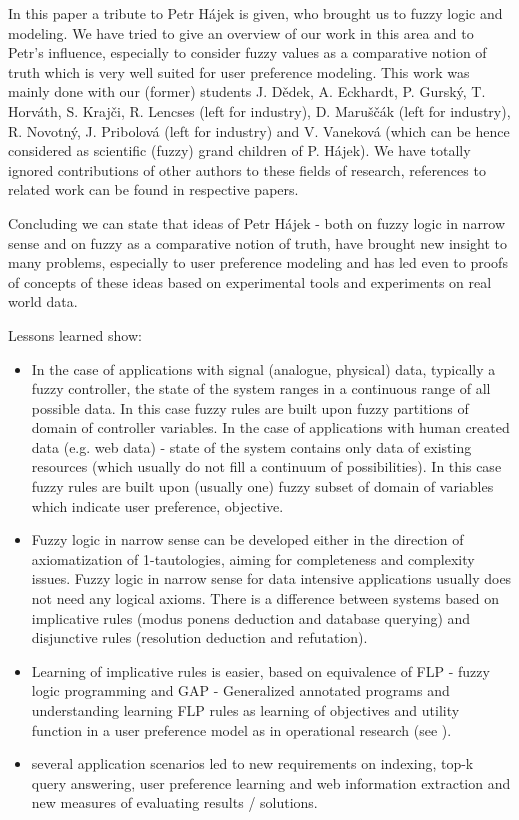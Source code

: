 In this paper a tribute to Petr H\'{a}jek is given, who brought us to fuzzy logic and modeling. We have tried to give an overview of our work in this area and to Petr's influence, especially to consider fuzzy values as a comparative notion of truth which is very well suited for user preference modeling. 
This work was mainly done with our (former) students 
J. D\v{e}dek,
A. Eckhardt,
P. Gursk\'{y},
T. Horv\'{a}th,
S. Kraj\v{c}i,
R. Lencses (left for industry),
D. Maru\v{s}\v{c}{\'a}k (left for industry),
R. Novotn\'{y},
J. Pribolov{\'{a}} (left for industry) and
V. Vanekov{\'{a}}
(which can be hence considered as scientific (fuzzy) grand children of P. H\'{a}jek).
We have totally ignored contributions of other authors to these fields of research, references to related work can be found in respective papers. 

     Concluding we can state that ideas of Petr H\'{a}jek - both on fuzzy logic in narrow sense and on fuzzy as a comparative notion of truth, have brought new insight to many problems, especially to user preference modeling and has led  even to proofs of concepts of these ideas based on experimental tools and experiments on real world data.
     
          Lessons learned show:

\begin{itemize}
	\item In the case of applications with signal (analogue, physical) data, typically a fuzzy controller, the state of the system ranges in a continuous range of all possible data. In this case fuzzy rules are built upon fuzzy partitions of domain of controller variables. In the case of applications with human created data (e.g. web data) - state of the system contains only data of existing resources (which usually do not fill a continuum of possibilities). In this case fuzzy rules are built upon (usually one) fuzzy subset of domain of variables which indicate user preference, objective.

	\item Fuzzy logic in narrow sense can be developed either in the direction of axiomatization of 1-tautologies, aiming for completeness and complexity issues. Fuzzy logic in narrow sense for data intensive applications usually does not need any logical axioms. There is a difference between systems based on implicative rules (modus ponens deduction and database querying) and disjunctive rules (resolution deduction and refutation). 

	\item Learning of implicative rules is easier, based on equivalence of FLP - fuzzy logic programming and GAP - Generalized annotated programs  and understanding learning FLP rules as learning of objectives and utility function in a user preference model as in operational research (see \cite{47}). 

	\item several application scenarios led to new requirements on indexing, top-k query answering, user preference learning and web information extraction and new measures of evaluating results / solutions. 
\end{itemize}


